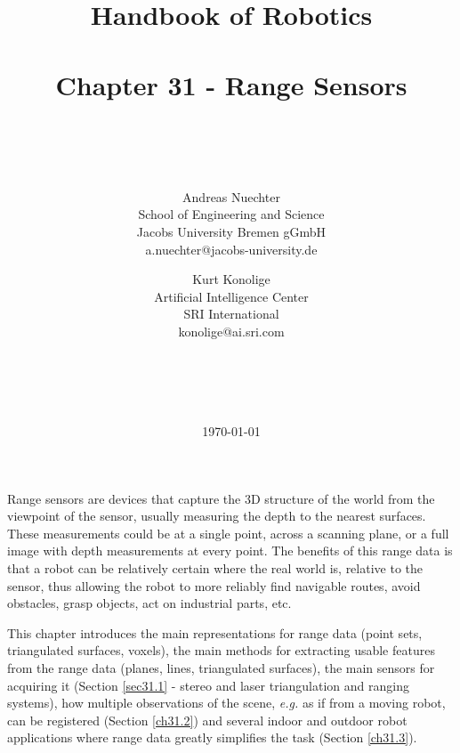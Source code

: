\documentclass[twocolumn,oneside]{book}
\begin{document}
\title{\LARGE{Handbook of Robotics\\
~\\
Chapter 31 - Range Sensors}\\
~\\
~}

\author{Andreas Nuechter\\
School of Engineering and Science \\
Jacobs University Bremen gGmbH \\
a.nuechter@jacobs-university.de \\
\and
Kurt Konolige\\
Artificial Intelligence Center\\
SRI International\\
konolige@ai.sri.com\\
\\
\\
\\
\\
}

\date{\today}

\maketitle


\tableofcontents


\setcounter{page}{1}

\setcounter{chapter}{31}

Range sensors are devices that capture the 3D structure of the world
from the viewpoint of the sensor, usually measuring the depth to the
nearest surfaces. These measurements could be at a single point,
across a scanning plane, or a full image with depth measurements at
every point.
The benefits of this range data is that a robot can be relatively 
certain where the real world is, relative to the sensor, thus allowing
the robot to more reliably find navigable routes, avoid obstacles,
grasp objects, act on industrial parts, etc.

This chapter introduces the main representations for range data 
(point sets, triangulated surfaces, voxels), the main methods 
for extracting usable features from the range data (planes, lines, triangulated surfaces),
the main sensors for acquiring it (Section \ref{sec31.1} -
stereo and laser triangulation and ranging systems),
how multiple observations of the scene, {\it e.g.} as if from a 
moving robot, can be registered (Section \ref{ch31.2})
and several indoor and outdoor robot applications where
range data greatly simplifies the task (Section \ref{ch31.3}).
\end{document}
